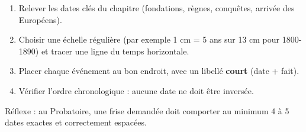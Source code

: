 \documentclass[11pt]{article}
\newcommand{\cle}[1]{{\popxbold\color{popdark}#1}}
\begin{document}
\begin{methode}
\begin{enumerate}
\item Relever les \cle{dates clés} du chapitre (fondations, règnes, conquêtes, arrivée des Européens).
\item Choisir une \cle{échelle} régulière (par exemple 1 cm = 5 ans sur 13 cm pour 1800-1890) et tracer une ligne du temps horizontale.
\item Placer chaque événement au bon endroit, avec un libellé \textbf{court} (date + fait).
\item Vérifier l'\cle{ordre chronologique} : aucune date ne doit être inversée.
\end{enumerate}
Réflexe : au Probatoire, une frise demandée doit comporter au minimum 4 à 5 dates exactes et correctement espacées.
\end{methode}
\end{document}
